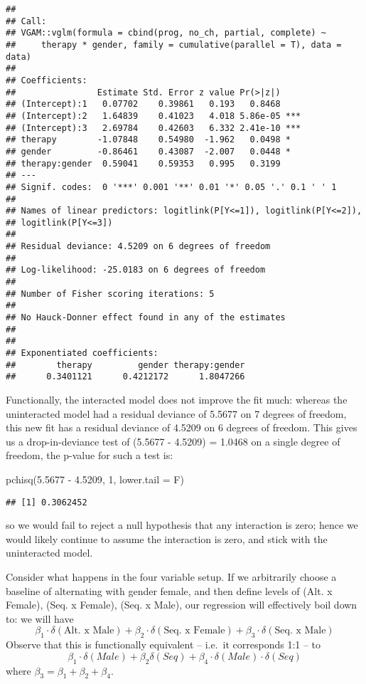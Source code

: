 \documentclass[
]{article}
\newenvironment{Shaded}{\begin{snugshade}}{\end{snugshade}}
\newcommand{\AttributeTok}[1]{\textcolor[rgb]{0.77,0.63,0.00}{#1}}
\newcommand{\DecValTok}[1]{\textcolor[rgb]{0.00,0.00,0.81}{#1}}
\newcommand{\FloatTok}[1]{\textcolor[rgb]{0.00,0.00,0.81}{#1}}
\newcommand{\FunctionTok}[1]{\textcolor[rgb]{0.00,0.00,0.00}{#1}}
\newcommand{\NormalTok}[1]{#1}
\newcommand{\SpecialCharTok}[1]{\textcolor[rgb]{0.00,0.00,0.00}{#1}}
\begin{document}
\begin{verbatim}
## 
## Call:
## VGAM::vglm(formula = cbind(prog, no_ch, partial, complete) ~ 
##     therapy * gender, family = cumulative(parallel = T), data = data)
## 
## Coefficients: 
##                Estimate Std. Error z value Pr(>|z|)    
## (Intercept):1   0.07702    0.39861   0.193   0.8468    
## (Intercept):2   1.64839    0.41023   4.018 5.86e-05 ***
## (Intercept):3   2.69784    0.42603   6.332 2.41e-10 ***
## therapy        -1.07848    0.54980  -1.962   0.0498 *  
## gender         -0.86461    0.43087  -2.007   0.0448 *  
## therapy:gender  0.59041    0.59353   0.995   0.3199    
## ---
## Signif. codes:  0 '***' 0.001 '**' 0.01 '*' 0.05 '.' 0.1 ' ' 1
## 
## Names of linear predictors: logitlink(P[Y<=1]), logitlink(P[Y<=2]), 
## logitlink(P[Y<=3])
## 
## Residual deviance: 4.5209 on 6 degrees of freedom
## 
## Log-likelihood: -25.0183 on 6 degrees of freedom
## 
## Number of Fisher scoring iterations: 5 
## 
## No Hauck-Donner effect found in any of the estimates
## 
## 
## Exponentiated coefficients:
##        therapy         gender therapy:gender 
##      0.3401121      0.4212172      1.8047266
\end{verbatim}

Functionally, the interacted model does not improve the fit much:
whereas the uninteracted model had a residual deviance of 5.5677 on 7
degrees of freedom, this new fit has a residual deviance of 4.5209 on 6
degrees of freedom. This gives us a drop-in-deviance test of (5.5677 -
4.5209) = 1.0468 on a single degree of freedom, the p-value for such a
test is:

\begin{Shaded}
\begin{Highlighting}[]
\FunctionTok{pchisq}\NormalTok{(}\FloatTok{5.5677} \SpecialCharTok{{-}} \FloatTok{4.5209}\NormalTok{, }\DecValTok{1}\NormalTok{, }\AttributeTok{lower.tail =}\NormalTok{ F)}
\end{Highlighting}
\end{Shaded}

\begin{verbatim}
## [1] 0.3062452
\end{verbatim}

so we would fail to reject a null hypothesis that any interaction is
zero; hence we would likely continue to assume the interaction is zero,
and stick with the uninteracted model.

Consider what happens in the four variable setup. If we arbitrarily
choose a baseline of alternating with gender female, and then define
levels of (Alt. x Female), (Seq. x Female), (Seq. x Male), our
regression will effectively boil down to: we will have \[
\beta_1\cdot  \delta(\text{Alt. x Male}) + \beta_2\cdot  \delta(\text{Seq. x Female}) + \beta_3\cdot  \delta(\text{Seq. x Male})
\] Observe that this is functionally equivalent -- i.e.~it corresponds
1:1 -- to \[
\beta_1\cdot \delta(Male) +  \beta_2\delta(Seq) + \beta_4\cdot \delta(Male)\cdot \delta(Seq)
\] where \(\beta_3 = \beta_1 + \beta_2 + \beta_4\).
\end{document}
